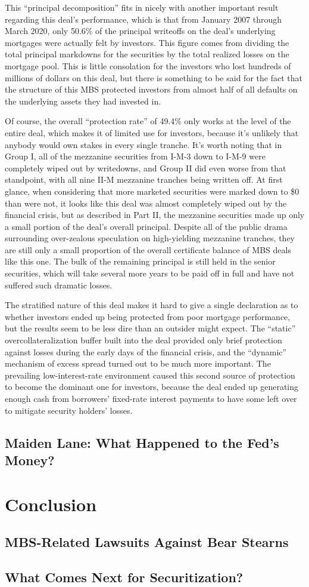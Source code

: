 \documentclass[12pt]{article}
\begin{document}
This “principal decomposition” fits in nicely with another important result regarding this deal’s performance, which is that from January 2007 through March 2020, only 50.6\% of the principal writeoffs on the deal’s underlying mortgages were actually felt by investors. This figure comes from dividing the total principal markdowns for the securities by the total realized losses on the mortgage pool. This is little consolation for the investors who lost hundreds of millions of dollars on this deal, but there is something to be said for the fact that the structure of this MBS protected investors from almost half of all defaults on the underlying assets they had invested in.
	
Of course, the overall “protection rate” of 49.4\% only works at the level of the entire deal, which makes it of limited use for investors, because it’s unlikely that anybody would own stakes in every single tranche. It’s worth noting that in Group I, all of the mezzanine securities from I-M-3 down to I-M-9 were completely wiped out by writedowns, and Group II did even worse from that standpoint, with all nine II-M mezzanine tranches being written off. At first glance, when considering that more marketed securities were marked down to \$0 than were not, it looks like this deal was almost completely wiped out by the financial crisis, but as described in Part II, the mezzanine securities made up only a small portion of the deal’s overall principal. Despite all of the public drama surrounding over-zealous speculation on high-yielding mezzanine tranches, they are still only a small proportion of the overall certificate balance of MBS deals like this one. The bulk of the remaining principal is still held in the senior securities, which will take several more years to be paid off in full and have not suffered such dramatic losses.

The stratified nature of this deal makes it hard to give a single declaration as to whether investors ended up being protected from poor mortgage performance, but the results seem to be less dire than an outsider might expect. The “static” overcollateralization buffer built into the deal provided only brief protection against losses during the early days of the financial crisis, and the “dynamic” mechanism of excess spread turned out to be much more important. The prevailing low-interest-rate environment caused this second source of protection to become the dominant one for investors, because the deal ended up generating enough cash from borrowers' fixed-rate interest payments to have some left over to mitigate security holders’ losses. 

\subsection*{Maiden Lane: What Happened to the Fed's Money?}


\section*{Conclusion}

\subsection*{MBS-Related Lawsuits Against Bear Stearns}

\subsection*{What Comes Next for Securitization?}
\end{document}
